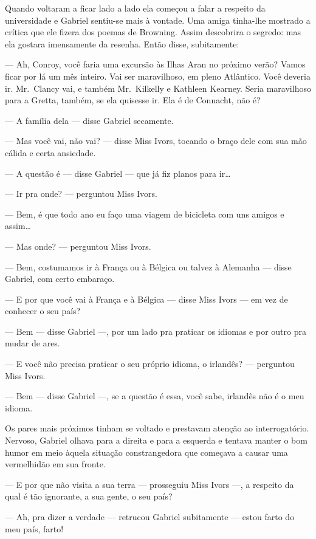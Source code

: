 Quando voltaram a ficar lado a lado ela começou a falar a respeito da
universidade e Gabriel sentiu-se mais à vontade.  Uma amiga tinha-lhe mostrado
a crítica que ele fizera dos poemas de Browning.  Assim descobrira o segredo:
mas ela gostara imensamente da resenha.  Então disse, subitamente:

--- Ah, Conroy, você faria uma excursão às Ilhas Aran no próximo verão?  Vamos
ficar por lá um mês inteiro.  Vai ser maravilhoso, em pleno Atlântico.  Você
deveria ir.  Mr.~Clancy vai, e também Mr.~Kilkelly e Kathleen Kearney.  Seria
maravilhoso para a Gretta, também, se ela quisesse ir.  Ela é de Connacht, não
é?

--- A família dela --- disse Gabriel secamente.

--- Mas você vai, não vai? --- disse Miss Ivors, tocando o braço dele com sua
mão cálida e certa ansiedade.

--- A questão é --- disse Gabriel --- que já fiz planos para ir\ldots{}

--- Ir pra onde? --- perguntou Miss Ivors.

--- Bem, é que todo ano eu faço uma viagem de bicicleta com uns amigos e
assim\ldots{}

--- Mas onde? --- perguntou Miss Ivors.

--- Bem, costumamos ir à França ou à Bélgica ou talvez à Alemanha --- disse
Gabriel, com certo embaraço.

--- E por que você vai à França e à Bélgica --- disse Miss Ivors --- em vez de
conhecer o seu país?

--- Bem --- disse Gabriel ---, por um lado pra praticar os idiomas e por outro
pra mudar de ares.

--- E você não precisa praticar o seu próprio idioma, o irlandês?  ---
perguntou Miss Ivors.

--- Bem --- disse Gabriel ---, se a questão é essa, você sabe, irlandês não é o
meu idioma.

Os pares mais próximos tinham se voltado e prestavam atenção ao interrogatório.
Nervoso, Gabriel olhava para a direita e para a esquerda e tentava manter o bom
humor em meio àquela situação constrangedora que começava a causar uma
vermelhidão em sua fronte.

--- E por que não visita a sua terra --- prosseguiu Miss Ivors ---, a respeito
da qual é tão ignorante, a sua gente, o seu país?

--- Ah, pra dizer a verdade --- retrucou Gabriel subitamente --- estou farto do
meu país, farto!

